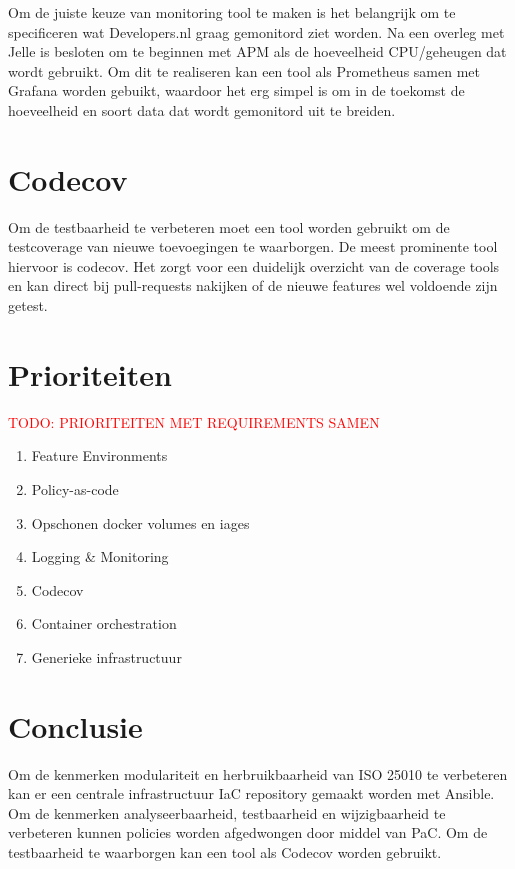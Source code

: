 Om de juiste keuze van monitoring tool te maken is het belangrijk om te specificeren wat Developers.nl graag gemonitord ziet worden. Na een overleg met Jelle is besloten om te beginnen met APM als de hoeveelheid CPU/geheugen dat wordt gebruikt. Om dit te realiseren kan een tool als Prometheus samen met Grafana worden gebuikt, waardoor het erg simpel is om in de toekomst de hoeveelheid en soort data dat wordt gemonitord uit te breiden.

\section{Codecov}
Om de testbaarheid te verbeteren moet een tool worden gebruikt om de testcoverage van nieuwe toevoegingen te waarborgen. De meest prominente tool hiervoor is codecov. Het zorgt voor een duidelijk overzicht van de coverage tools en kan direct bij pull-requests nakijken of de nieuwe features wel voldoende zijn getest.

\section{Prioriteiten}
\textcolor{red}{TODO: PRIORITEITEN MET REQUIREMENTS SAMEN}
\begin{enumerate}
	\item Feature Environments
	\item Policy-as-code
	\item Opschonen docker volumes en iages
	\item Logging \& Monitoring
	\item Codecov
	\item Container orchestration
	\item Generieke infrastructuur
\end{enumerate}

\section{Conclusie}
Om de kenmerken modulariteit en herbruikbaarheid van ISO 25010 te verbeteren kan er een centrale infrastructuur IaC repository gemaakt worden met Ansible. Om de kenmerken analyseerbaarheid, testbaarheid en wijzigbaarheid te verbeteren kunnen policies worden afgedwongen door middel van PaC. Om de testbaarheid te waarborgen kan een tool als Codecov worden gebruikt.